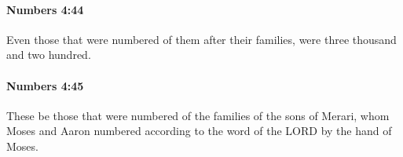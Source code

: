 		\paragraph{Numbers 4:44} %
			\label{NUMBERS-4-44}

			Even those that were numbered of them after their families, were three thousand and two hundred.


		\paragraph{Numbers 4:45} %
			\label{NUMBERS-4-45}

			These be those that were numbered of the families of the sons of Merari, whom Moses and Aaron numbered according to the word of the LORD by the hand of Moses.


